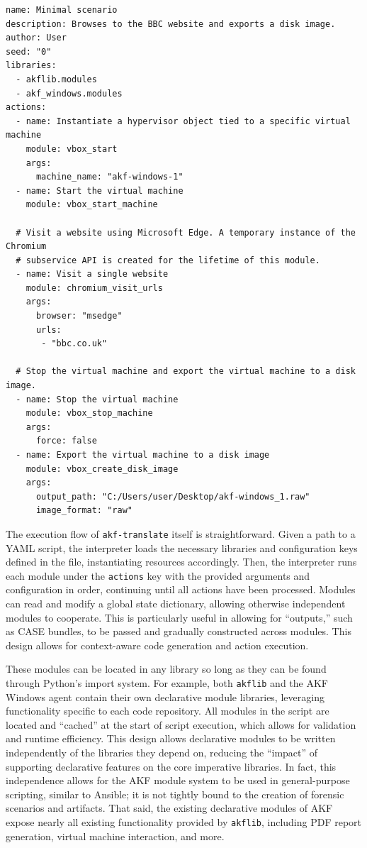 \documentclass[final,5p,times,twocolumn]{elsarticle}
\newcommand{\passthrough}[1]{#1}
\begin{document}
\begin{lstlisting}[label={lst:6.3.2a}, caption={Example of a declarative AKF scenario}, ]
name: Minimal scenario
description: Browses to the BBC website and exports a disk image.
author: User
seed: "0"
libraries:
  - akflib.modules
  - akf_windows.modules
actions:
  - name: Instantiate a hypervisor object tied to a specific virtual machine
    module: vbox_start
    args:
      machine_name: "akf-windows-1"
  - name: Start the virtual machine
    module: vbox_start_machine

  # Visit a website using Microsoft Edge. A temporary instance of the Chromium
  # subservice API is created for the lifetime of this module.
  - name: Visit a single website
    module: chromium_visit_urls
    args:
      browser: "msedge"
      urls: 
       - "bbc.co.uk"

  # Stop the virtual machine and export the virtual machine to a disk image.
  - name: Stop the virtual machine
    module: vbox_stop_machine
    args:
      force: false
  - name: Export the virtual machine to a disk image
    module: vbox_create_disk_image
    args:
      output_path: "C:/Users/user/Desktop/akf-windows_1.raw"
      image_format: "raw"
\end{lstlisting}

The execution flow of \passthrough{\lstinline!akf-translate!} itself is
straightforward. Given a path to a YAML script, the interpreter loads
the necessary libraries and configuration keys defined in the file,
instantiating resources accordingly. Then, the interpreter runs each
module under the \passthrough{\lstinline!actions!} key with the provided
arguments and configuration in order, continuing until all actions have
been processed. Modules can read and modify a global state dictionary,
allowing otherwise independent modules to cooperate. This is
particularly useful in allowing for ``outputs,'' such as CASE bundles,
to be passed and gradually constructed across modules. This design
allows for context-aware code generation and action execution.

These modules can be located in any library so long as they can be found
through Python's import system. For example, both
\passthrough{\lstinline!akflib!} and the AKF Windows agent contain their
own declarative module libraries, leveraging functionality specific to
each code repository. All modules in the script are located and
``cached'' at the start of script execution, which allows for validation
and runtime efficiency. This design allows declarative modules to be
written independently of the libraries they depend on, reducing the
``impact'' of supporting declarative features on the core imperative
libraries. In fact, this independence allows for the AKF module system
to be used in general-purpose scripting, similar to Ansible; it is not
tightly bound to the creation of forensic scenarios and artifacts. That
said, the existing declarative modules of AKF expose nearly all existing
functionality provided by \passthrough{\lstinline!akflib!}, including
PDF report generation, virtual machine interaction, and more.
\end{document}
